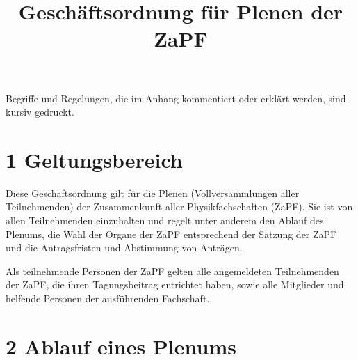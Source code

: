 \documentclass[12pt,oneside]{scrartcl}
\title{\phantomsection%
  Geschäftsordnung für Plenen der ZaPF%
  \label{geschaftsordnung-fur-plenen-der-zapf}}
\author{}
\date{}
\begin{document}
\maketitle

Begriffe und Regelungen, die im Anhang kommentiert oder erklärt werden, sind
kursiv gedruckt.


\section{1 Geltungsbereich%
  \label{geltungsbereich}%
}

Diese Geschäftsordnung gilt für die Plenen (Vollversammlungen aller Teilnehmenden)
der Zusammenkunft aller Physikfachschaften (ZaPF).
Sie ist von allen Teilnehmenden einzuhalten und regelt unter
anderem den Ablauf des Plenums, die Wahl der Organe der ZaPF entsprechend der
Satzung der ZaPF und die Antragsfristen und Abstimmung von Anträgen.

Als teilnehmende Personen der ZaPF gelten alle angemeldeten Teilnehmenden
der ZaPF, die ihren Tagungsbeitrag entrichtet haben, sowie alle
Mitglieder und helfende Personen der ausführenden Fachschaft.


\section{2 Ablauf eines Plenums%
  \label{ablauf-eines-plenums}%
}
\end{document}
